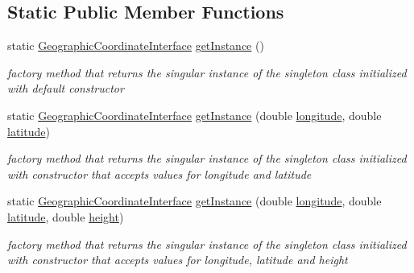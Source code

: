 \subsection*{Static Public Member Functions}
\begin{DoxyCompactItemize}
\item 
static \hyperlink{classcoordinates_1_1_geographic_coordinate_interface}{Geographic\+Coordinate\+Interface} \hyperlink{classcoordinates_1_1_geographic_coordinate_interface_a954409872a73cc8c7fc49f87d17f88b5}{get\+Instance} ()
\begin{DoxyCompactList}\small\item\em factory method that returns the singular instance of the singleton class initialized with default constructor \end{DoxyCompactList}\item 
static \hyperlink{classcoordinates_1_1_geographic_coordinate_interface}{Geographic\+Coordinate\+Interface} \hyperlink{classcoordinates_1_1_geographic_coordinate_interface_acb73fce8bcd43035599dd462dbee2509}{get\+Instance} (double \hyperlink{classcoordinates_1_1_geographic_coordinate_interface_ae82d3ae4819bc8e243ca54f6568ec005}{longitude}, double \hyperlink{classcoordinates_1_1_geographic_coordinate_interface_a80705d81d2b4631d1ac928f703715d0c}{latitude})
\begin{DoxyCompactList}\small\item\em factory method that returns the singular instance of the singleton class initialized with constructor that accepts values for longitude and latitude \end{DoxyCompactList}\item 
static \hyperlink{classcoordinates_1_1_geographic_coordinate_interface}{Geographic\+Coordinate\+Interface} \hyperlink{classcoordinates_1_1_geographic_coordinate_interface_a38627aff97345b4ae6c87e37e8a5e406}{get\+Instance} (double \hyperlink{classcoordinates_1_1_geographic_coordinate_interface_ae82d3ae4819bc8e243ca54f6568ec005}{longitude}, double \hyperlink{classcoordinates_1_1_geographic_coordinate_interface_a80705d81d2b4631d1ac928f703715d0c}{latitude}, double \hyperlink{classcoordinates_1_1_geographic_coordinate_interface_a172154f497767cdc832c1a851552bd8b}{height})
\begin{DoxyCompactList}\small\item\em factory method that returns the singular instance of the singleton class initialized with constructor that accepts values for longitude, latitude and height \end{DoxyCompactList}\end{DoxyCompactItemize}
